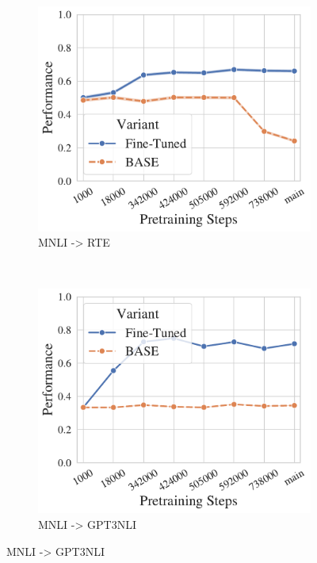 \begin{figure}[t!]
    \centering
    \begin{subfigure}[b]{0.25\textwidth}
    \includegraphics[width=\the\columnwidth]{figures/fig_files/ood/sft_evalrte-trainmnli.pdf}
        \caption{MNLI -> RTE}
    \end{subfigure}%
    ~ 
    \begin{subfigure}[b]{0.25\textwidth}
    \includegraphics[width=\the\columnwidth]{figures/fig_files/ood/sft_evalgpt3nli-trainmnli.pdf}
        \caption{MNLI -> GPT3NLI}
    \end{subfigure}%

\end{figure}

